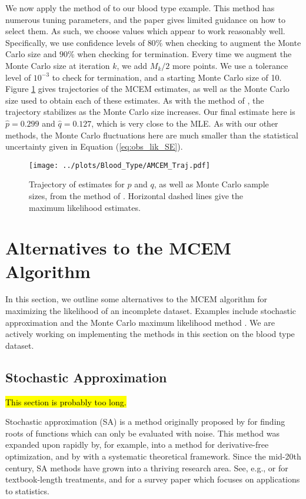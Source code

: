 \documentclass[11pt, oneside]{article}   	%
\begin{document}
We now apply the method of \citeauthor{Caf05} to our blood type example. This method has numerous tuning parameters, and the paper gives limited guidance on how to select them. As such, we choose values which appear to work reasonably well. Specifically, we use confidence levels of $80\%$ when checking to augment the Monte Carlo size and $90\%$ when checking for termination. Every time we augment the Monte Carlo size at iteration $k$, we add $M_k/2$ more points. We use a tolerance level of $10^{-3}$ to check for termination, and a starting Monte Carlo size of 10. Figure \ref{fig:blood_AMCEM_traj} gives trajectories of the MCEM estimates, as well as the Monte Carlo size used to obtain each of these estimates. As with the method of \citet{Boo99}, the trajectory stabilizes as the Monte Carlo size increases. Our final estimate here is $\hat{p} = 0.299$ and $\hat{q} = 0.127$, which is very close to the MLE. As with our other methods, the Monte Carlo fluctuations here are much smaller than the statistical uncertainty given in Equation (\ref{eq:obs_lik_SE}).

\begin{figure}
    \centering
    \caption{Trajectory of estimates for $p$ and $q$, as well as Monte Carlo sample sizes, from the method of \citeauthor{Caf05}. Horizontal dashed lines give the maximum likelihood estimates.}
    \label{fig:blood_AMCEM_traj}
    \texttt{[image: ../plots/Blood\_Type/AMCEM\_Traj.pdf]}   
\end{figure}

\section{Alternatives to the MCEM Algorithm}
\label{sec2:alternatives}

In this section, we outline some alternatives to the MCEM algorithm for maximizing the likelihood of an incomplete dataset. Examples include stochastic approximation \citep{Rob51, Lai03} and the Monte Carlo maximum likelihood method \citep{Gel93, Gey94}. We are actively working on implementing the methods in this section on the blood type dataset.


\subsection{Stochastic Approximation}
\label{sec2:SAEM}

\hl{This section is probably too long.}

Stochastic approximation (SA) is a method originally proposed by \citet{Rob51} for finding roots of functions which can only be evaluated with noise. This method was expanded upon rapidly by, for example, \citet{Kie52} into a method for derivative-free optimization, and by \citet{Dvo56} with a systematic theoretical framework. Since the mid-20th century, SA methods have grown into a thriving research area. See, e.g., \citet{Kus97} or \citet{Bor22} for textbook-length treatments, and \citet{Lai03} for a survey paper which focuses on applications to statistics.
\end{document}
